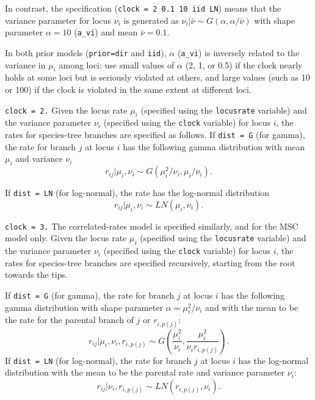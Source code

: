 \documentclass[a4paper]{book}
\numberwithin{equation}{section} \renewcommand{\baselinestretch}{0.55}
\begin{document}
In contrast, the specification (\texttt{clock = 2 0.1 10 iid LN})
means that the variance parameter for locus $\nu_i$ is generated as
$\nu_i|\bar\nu \sim G(\alpha, \alpha/\bar\nu)$ with shape parameter
$\alpha = 10$ (\texttt{a\_vi}) and mean $\bar\nu = 0.1$.

In both prior models (\texttt{prior=dir} and \texttt{iid}), $\alpha$
(\texttt{a\_vi}) is inversely related to the variance in $\mu_i$ among
loci: use small values of $\alpha$ (2, 1, or 0.5) if the clock nearly
holds at some loci but is seriously violated at others, and large
values (such as 10 or 100) if the clock is violated in the same extent
at different loci.

\texttt{clock = 2.} Given the locus rate $\mu_i$ (specified using the
\texttt{locusrate} variable) and the variance parameter $\nu_i$
(specified using the \texttt{clock} variable) for locus $i$, the rates
for species-tree branches are specified as follows.  If \texttt{dist =
  G} (for gamma), the rate for branch $j$ at locus $i$ has the
following gamma distribution with mean $\mu_i$ and variance $\nu_i$
\begin{equation*}
  r_{ij} | \mu_i, \nu_i \sim G(\mu_i^2/\nu_i, \mu_i/\nu_i).
\end{equation*}

If \texttt{dist = LN} (for log-normal), the rate has the log-normal
distribution
\begin{equation*}
  r_{ij} | \mu_i, \nu_i \sim LN(\mu_i, \nu_i).
\end{equation*}

\texttt{clock = 3.}  The correlated-rates model is specified
similarly, and for the MSC model only.  Given the locus rate $\mu_i$
(specified using the \texttt{locusrate} variable) and the variance
parameter $\nu_i$ (specified using the \texttt{clock} variable) for
locus $i$, the rates for species-tree branches are specified
recursively, starting from the root towards the tips.

If \texttt{dist = G} (for gamma), the rate for branch $j$ at locus $i$
has the following gamma distribution with shape parameter
$\alpha = \mu_i^2/\nu_i$ and with the mean to be the rate for the
parental branch of $j$ or $r_{i,p(j)}$:
\begin{equation*}
  r_{ij} | \mu_i, \nu_i, r_{i,p(j)} \sim G(\frac{\mu_i^2}{\nu_i}, \frac{\mu_i^2}{\nu_i r_{i,p(j)}}).
\end{equation*}
If \texttt{dist = LN} (for log-normal), the rate for branch $j$ at
locus $i$ has the log-normal distribution with the mean to be the
parental rate and variance parameter $\nu_i$:
\begin{equation*}
  r_{ij} | \nu_i, r_{i,p(j)} \sim LN(r_{i,p(j)}, \nu_i).
\end{equation*}
\end{document}
